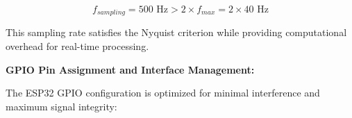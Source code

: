 \documentclass[12pt,a4paper]{article}
\begin{document}
\begin{equation*}
f_{sampling} = 500 \text{ Hz} > 2 \times f_{max} = 2 \times 40 \text{ Hz}
\end{equation*}

This sampling rate satisfies the Nyquist criterion while providing computational overhead for real-time processing.

\vspace{0.5cm}








\textbf{GPIO Pin Assignment and Interface Management:}

The ESP32 GPIO configuration is optimized for minimal interference and maximum signal integrity:
\end{document}
